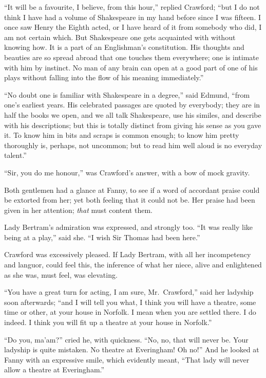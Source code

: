 \documentclass{article}
\begin{document}
``It will be a favourite, I believe, from this hour,''
replied Crawford; ``but I do not think I have had a volume
of Shakespeare in my hand before since I was fifteen.
I once saw Henry the Eighth acted, or I have heard
of it from somebody who did, I am not certain which.
But Shakespeare one gets acquainted with without knowing how.
It is a part of an Englishman's constitution.  His thoughts
and beauties are so spread abroad that one touches
them everywhere; one is intimate with him by instinct.
No man of any brain can open at a good part of one
of his plays without falling into the flow of his
meaning immediately.''

``No doubt one is familiar with Shakespeare in a degree,''
said Edmund, ``from one's earliest years.  His celebrated
passages are quoted by everybody; they are in half
the books we open, and we all talk Shakespeare,
use his similes, and describe with his descriptions;
but this is totally distinct from giving his sense as you
gave it.  To know him in bits and scraps is common enough;
to know him pretty thoroughly is, perhaps, not uncommon;
but to read him well aloud is no everyday talent.''

``Sir, you do me honour,'' was Crawford's answer, with a bow
of mock gravity.

Both gentlemen had a glance at Fanny, to see if a word
of accordant praise could be extorted from her; yet both
feeling that it could not be.  Her praise had been given
in her attention; \emph{that} must content them.

Lady Bertram's admiration was expressed, and strongly too.
``It was really like being at a play,'' said she.  ``I wish
Sir Thomas had been here.''

Crawford was excessively pleased.  If Lady Bertram,
with all her incompetency and languor, could feel this,
the inference of what her niece, alive and enlightened
as she was, must feel, was elevating.

``You have a great turn for acting, I am sure, Mr.\ Crawford,''
said her ladyship soon afterwards; ``and I will tell you what,
I think you will have a theatre, some time or other,
at your house in Norfolk.  I mean when you are settled there.
I do indeed.  I think you will fit up a theatre at your
house in Norfolk.''

``Do you, ma'am?'' cried he, with quickness.  ``No, no,
that will never be.  Your ladyship is quite mistaken.
No theatre at Everingham!  Oh no!''  And he looked at Fanny
with an expressive smile, which evidently meant, ``That lady
will never allow a theatre at Everingham.''
\end{document}
